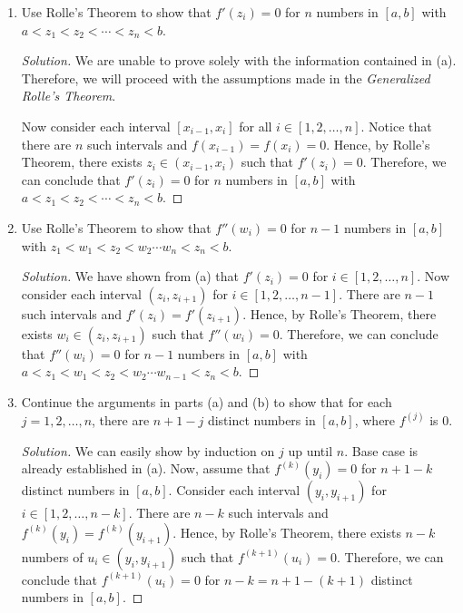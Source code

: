 \documentclass{article}
\begin{document}
\begin{enumerate}[label=\alph*.]
    \item Use Rolle's Theorem to show that $f'(z_i) = 0$ for $n$ numbers in $[a,b]$ with 
    $a < z_1 < z_2 < \cdots < z_{n} < b$.

    \begin{proof}[Solution]
        We are unable to prove solely with the information contained in (a). Therefore, we will 
        proceed with the assumptions made in the \emph{Generalized Rolle's Theorem}.

        Now consider each interval $[x_{i-1}, x_i]$ for all $i\in [1, 2, \dots, n]$. Notice that 
        there are $n$ such intervals and $f(x_{i-1}) = f(x_i)=0$. Hence, by 
        Rolle's Theorem, there exists $z_i \in (x_{i-1}, x_i)$ such that $f'(z_i) = 0$. Therefore, 
        we can conclude that $f'(z_i) = 0$ for $n$ numbers in $[a,b]$ with $a < z_1 < z_2 < \cdots 
        < z_{n} < b$.
    \end{proof}
    
    \item Use Rolle's Theorem to show that $f''(w_i) = 0$ for $n-1$ numbers in $[a,b]$ with 
    $z_1 < w_1 < z_2 < w_2 \cdots w_{n} < z_{n} < b$.

    \begin{proof}[Solution]
        We have shown from (a) that $f'(z_i) = 0$ for $i \in [1, 2, \dots, n]$. Now consider each 
        interval $(z_i, z_{i+1})$ for $i \in [1, 2, \dots, n-1]$. There are $n-1$ such intervals and 
        $f'(z_i) = f'(z_{i+1})$. Hence, by Rolle's Theorem, there exists $w_i \in (z_i, z_{i+1})$ 
        such that $f''(w_i) = 0$. Therefore, we can conclude that $f''(w_i) = 0$ for $n-1$ numbers 
        in $[a,b]$ with $a < z_1 < w_1 < z_2 < w_2 \cdots w_{n-1} < z_{n} < b$.
    \end{proof}

    \item Continue the arguments in parts (a) and (b) to show that for each $j = 1, 2, \dots, n$, 
    there are $n+1-j$ distinct numbers in $[a,b]$, where $f^{(j)}$ is 0.

    \begin{proof}[Solution]
        We can easily show by induction on $j$ up until $n$. Base case is already established in (a). Now, assume that 
        $f^{(k)}(y_i) = 0$ for $n+1-k$ distinct numbers in $[a,b]$. Consider each interval $(y_i, 
        y_{i+1})$ for $i\in [1, 2, \dots, n-k]$. There are $n-k$ such intervals and $f^{(k)}(y_i) =
        f^{(k)}(y_{i+1})$. Hence, by Rolle's Theorem, there exists $n-k$ numbers of $u_i \in (y_i, y_{i+1})$ such 
        that $f^{(k+1)}(u_i) = 0$. Therefore, we can conclude that $f^{(k+1)}(u_i) = 0$ for $n-k = 
        n + 1 - (k+1)$ distinct numbers in $[a,b]$. 


\end{proof}
\end{enumerate}
\end{document}
